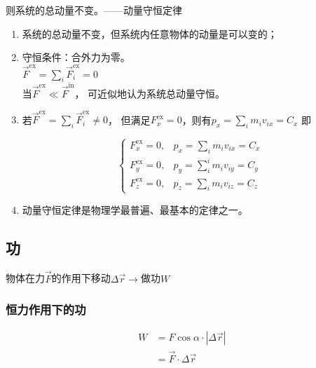 \documentclass[12pt, a4paper]{article}
\numberwithin{equation}{section}
\begin{document}
    则系统的总动量不变。——动量守恒定律

    \begin{enumerate}
        \item 系统的总动量不变，但系统内任意物体的动量是可以变的；
        \item 守恒条件：合外力为零。\\
            \(\overrightarrow{F}^{\mathrm{ex}} = \sum_i \overrightarrow{F}_i^{\mathrm{ex}}= 0\)\\
            当\(\overrightarrow{F}^{\mathrm{ex}} \ll \overrightarrow{F}^{\mathrm{in}}\)，
            可近似地认为系统总动量守恒。
        \item 若\(\overrightarrow{F}^{\mathrm{ex}} = \sum_i \overrightarrow{F}_i^{\mathrm{ex}}\neq 0\)，
            但满足\(F_{x}^{\mathrm{ex}} = 0\)，则有$p_x=\sum_i m_i v_{i x}=C_x$
            即

            \begin{equation}
                \begin{cases}F_x^{\mathrm{ex}}=0, & p_x=\sum_i m_i v_{i x}=C_x \\
                F_y^{\mathrm{ex}}=0, & p_y=\sum_i^i m_i v_{i y}=C_y \\
                F_z^{\mathrm{ex}}=0, & p_z=\sum_i m_i v_{i z}=C_z\end{cases}
            \end{equation}
        \item 动量守恒定律是物理学最普遍、最基本的定律之一。
    \end{enumerate}

\subsection{功}

    物体在力\(\overrightarrow{F}\)的作用下移动\(\Delta \overrightarrow{r} \rightarrow\)做功\(W\)

\subsubsection{恒力作用下的功}

    \begin{equation}
        \begin{aligned}
        W & =F \cos \alpha \cdot|\Delta \overrightarrow{r}| \\
        & =\overrightarrow{F} \cdot \Delta \overrightarrow{r}
        \end{aligned}
    \end{equation}
\end{document}
